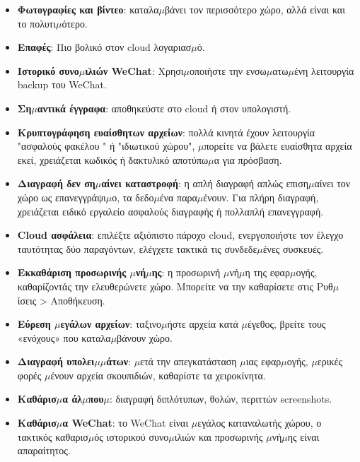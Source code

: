 
\begin{itemize}
  \item \textbf{Φωτογραφίες και βίντεο}: καταλα$\mu$βάνει τον περισσότερο χώρο, αλλά είναι και το πολυτι$\mu$ότερο.
  \item \textbf{Επαφές}: Πιο βολικό στον cloud λογαριασ$\mu$ό.
  \item \textbf{Ιστορικό συνο$\mu$ιλιών WeChat}: Χρησι$\mu$οποιήστε την ενσω$\mu$ατω$\mu$ένη λειτουργία backup του WeChat.
  \item \textbf{Ση$\mu$αντικά έγγραφα}: αποθηκεύστε στο cloud ή στον υπολογιστή.
\end{itemize}


\begin{itemize}
  \item \textbf{Κρυπτογράφηση ευαίσθητων αρχείων}: πολλά κινητά έχουν λειτουργία "ασφαλούς φακέλου " ή "ιδιωτικού χώρου", $\mu$πορείτε να βάλετε ευαίσθητα αρχεία εκεί, χρειάζεται κωδικός ή δακτυλικό αποτύπω$\mu$α για πρόσβαση.
  \item \textbf{Διαγραφή δεν ση$\mu$αίνει καταστροφή}: η απλή διαγραφή απλώς επιση$\mu$αίνει τον χώρο ως επανεγγράψι$\mu$ο, τα δεδο$\mu$ένα παρα$\mu$ένουν. Για πλήρη διαγραφή, χρειάζεται ειδικό εργαλείο ασφαλούς διαγραφής ή πολλαπλή επανεγγραφή.
  \item \textbf{Cloud ασφάλεια}: επιλέξτε αξιόπιστο πάροχο cloud, ενεργοποιήστε τον έλεγχο ταυτότητας δύο παραγόντων, ελέγχετε τακτικά τις συνδεδε$\mu$ένες συσκευές.
\end{itemize}


\begin{itemize}
  \item \textbf{Εκκαθάριση προσωρινής $\mu$νή$\mu$ης}: η προσωρινή $\mu$νή$\mu$η της εφαρ$\mu$ογής, καθαρίζοντάς την ελευθερώνετε χώρο. Μπορείτε να την καθαρίσετε στις Ρυθ$\mu$ίσεις > Αποθήκευση.
  \item \textbf{Εύρεση $\mu$εγάλων αρχείων}: ταξινο$\mu$ήστε αρχεία κατά $\mu$έγεθος, βρείτε τους «ενόχους» που καταλα$\mu$βάνουν χώρο.
  \item \textbf{Διαγραφή υπολει$\mu$$\mu$άτων}: $\mu$ετά την απεγκατάσταση $\mu$ιας εφαρ$\mu$ογής, $\mu$ερικές φορές $\mu$ένουν αρχεία σκουπιδιών, καθαρίστε τα χειροκίνητα.
  \item \textbf{Καθάρισ$\mu$α άλ$\mu$που$\mu$}: διαγραφή διπλότυπων, θολών, περιττών screenshots.
  \item \textbf{Καθάρισ$\mu$α WeChat}: το WeChat είναι $\mu$εγάλος καταναλωτής χώρου, ο τακτικός καθαρισ$\mu$ός ιστορικού συνο$\mu$ιλιών και προσωρινής $\mu$νή$\mu$ης είναι απαραίτητος.
\end{itemize}

